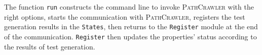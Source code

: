 \documentclass[web]{frama-c-book}
\begin{document}
The function \lstinline[language=OCaml]'run' constructs the command line to invoke \textsc{PathCrawler} with the right options, starts the communication with \textsc{PathCrawler}, registers the test generation results in the \lstinline[language=OCaml]'States', then returns to the \lstinline[language=OCaml]'Register' module at the end of the communication.
\lstinline[language=OCaml]'Register' then updates the properties' status according to the results of test generation.



\appendix



\cleardoublepage
{}
{}




\cleardoublepage
{}
{}
\listoffigures


\cleardoublepage
{}
{}
\printindex
\end{document}
